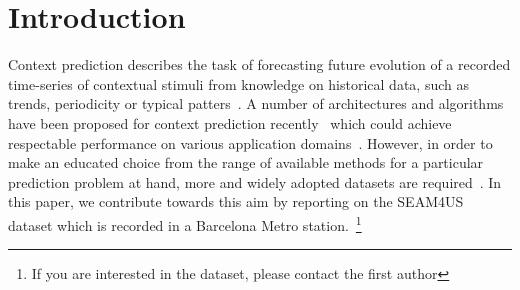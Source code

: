 \section{Introduction}
\label{sec:introduction}
Context prediction describes the task of forecasting future evolution of a recorded time-series of contextual stimuli from knowledge on historical data, such as trends, periodicity or typical patters~\cite{4011,5001}.
A number of architectures and algorithms have been proposed for context prediction recently~\cite{4027,2097,Prediction_Eldaw_2013} which could achieve respectable performance on various application domains~\cite{4026,Prediction_Zhang_2013}.
However, in order to make an educated choice from the range of available methods for a particular prediction problem at hand, more and widely adopted datasets are required~\cite{Prediction_Zhang_2012}.
In this paper, we contribute towards this aim by reporting on the SEAM4US dataset which is recorded in a Barcelona Metro station.~\footnote{If you are interested in the dataset, please contact the first author}

